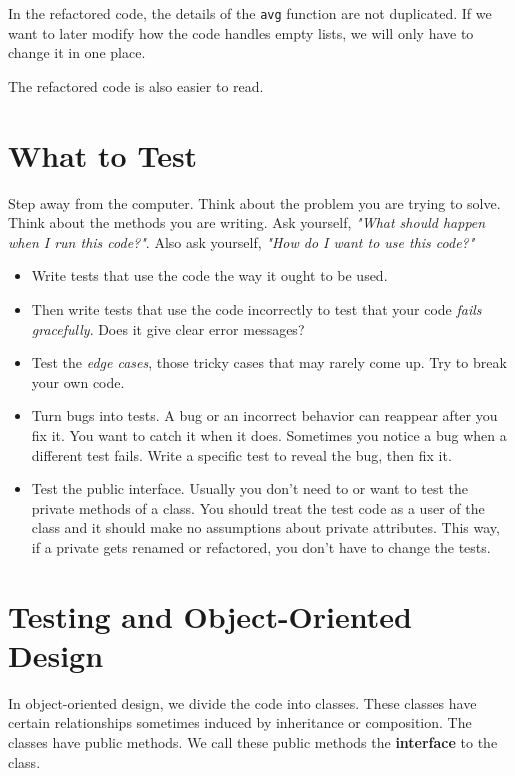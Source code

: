 In the refactored code, the details of the \texttt{avg} function are not duplicated.  If we want to later modify how the code handles empty lists, we will only have to change it in one place.  


The refactored code is also easier to read.  

\section{What to Test}


Step away from the computer.  Think about the problem you are trying to solve.  Think about the methods you are writing.  Ask yourself, \emph{"What should happen when I run this code?"}. Also ask yourself, \emph{"How do I want to use this code?"}

\begin{itemize}

\item Write tests that use the code the way it ought to be used.

\item Then write tests that use the code incorrectly to test that your code \emph{fails gracefully}.  Does it give clear error messages?

\item Test the \emph{edge cases}, those tricky cases that may rarely come up.  Try to break your own code.

\item Turn bugs into tests.  A bug or an incorrect behavior can reappear after you fix it.  You want to catch it when it does.  Sometimes you notice a bug when a different test fails.  Write a specific test to reveal the bug, then fix it.

\item Test the public interface.  Usually you don’t need to or want to test the private methods of a class.  You should treat the test code as a user of the class and it should make no assumptions about private attributes.  This way, if a private gets renamed or refactored, you don’t have to change the tests.

\end{itemize}
\section{Testing and Object-Oriented Design}


In object-oriented design, we divide the code into classes.  These classes have certain relationships sometimes induced by inheritance or composition.  The classes have public methods.  We call these public methods the \textbf{interface} to the class.


